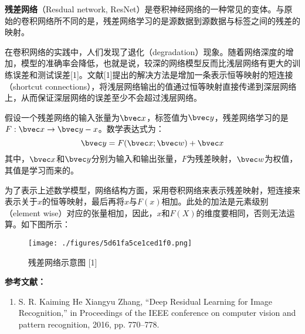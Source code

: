 
\textbf{残差网络}（Resdual network, ResNet）是卷积神经网络的一种常见的变体。与原始的卷积网络所不同的是，残差网络学习的是源数据到源数据与标签之间的残差的映射。

在卷积网络的实践中，人们发现了退化（degradation）现象。随着网络深度的增加，模型的准确率会降低，也就是说，较深的网络模型反而比浅层网络有更大的训练误差和测试误差[1]。文献[1]提出的解决方法是增加一条表示恒等映射的短连接（shortcut connections），将浅层网络输出的值通过恒等映射直接传递到深层网络上，从而保证深层网络的误差至少不会超过浅层网络。

假设一个残差网络的输入张量为$\bvec x$，标签值为$\bvec y$，残差网络学习的是$F: \bvec x \rightarrow \bvec y-x$。数学表达式为：
\begin{equation}
\bvec y=F(\bvec  x;\bvec  w)+\bvec x
\end{equation}
其中，$\bvec x$和$\bvec y$分别为输入和输出张量，$F$为残差映射，$\bvec w$为权值，其值是学习而来的。

为了表示上述数学模型，网络结构方面，采用卷积网络来表示残差映射，短连接来表示关于$x$的恒等映射，最后再将$x$与$F(x)$相加。此处的加法是元素级别（element wise）对应的张量相加，因此，$x$和$F(X)$的维度要相同，否则无法运算。如下图所示：
\begin{figure}[ht]
\centering
\texttt{[image: ./figures/5d61fa5ce1ced1f0.png]}
\caption{残差网络示意图 [1]} \label{fig_ResNet}
\end{figure}


\textbf{参考文献：}
\begin{enumerate}
\item S. R. Kaiming He Xiangyu Zhang, “Deep Residual Learning for Image Recognition,” in Proceedings of the IEEE conference on computer vision and pattern recognition, 2016, pp. 770–778.
\end{enumerate}
